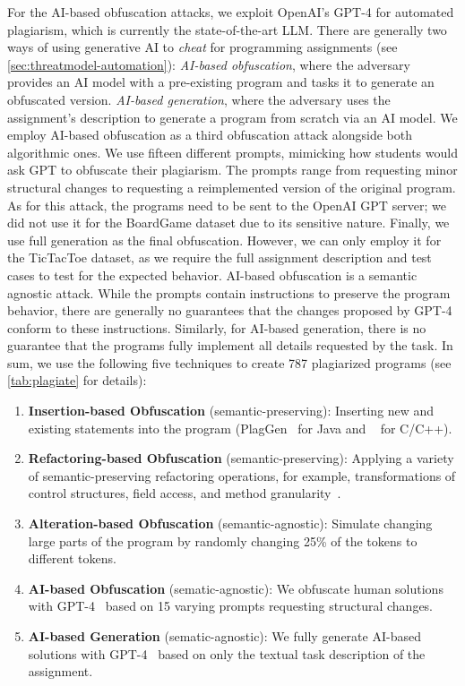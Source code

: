For the AI-based obfuscation attacks, we exploit OpenAI's GPT-4 for automated plagiarism, which is currently the state-of-the-art LLM.
There are generally two ways of using generative AI to \textit{cheat} for programming assignments (see \autoref{sec:threatmodel-automation}):
\textit{AI-based obfuscation}, where the adversary provides an AI model with a pre-existing program and tasks it to generate an obfuscated version.
\textit{AI-based generation}, where the adversary uses the assignment's description to generate a program from scratch via an AI model.
%
We employ AI-based obfuscation as a third obfuscation attack alongside both algorithmic ones. We use fifteen different prompts, mimicking how students would ask GPT to obfuscate their plagiarism.
The prompts range from requesting minor structural changes to requesting a reimplemented version of the original program. As for this attack, the programs need to be sent to the OpenAI GPT server; we did not use it for the BoardGame dataset due to its sensitive nature.
Finally, we use full generation as the final obfuscation. However, we can only employ it for the TicTacToe dataset, as we require the full assignment description and test cases to test for the expected behavior.
AI-based obfuscation is a semantic agnostic attack. While the prompts contain instructions to preserve the program behavior, there are generally no guarantees that the changes proposed by GPT-4 conform to these instructions. 
Similarly, for AI-based generation, there is no guarantee that the programs fully implement all details requested by the task.
In sum, we use the following five techniques to create 787 plagiarized programs (see \autoref{tab:plagiate} for details):
\begin{enumerate}[noitemsep]
 \item \textbf{Insertion-based Obfuscation} (semantic-preserving): Inserting new and existing statements into the program (PlagGen~\cite{Broedel2023} for Java and \mossad~\cite{DevoreMcDonald2020} for C/C++).
 \item \textbf{Refactoring-based Obfuscation} (semantic-preserving): Applying a variety of semantic-preserving refactoring operations, for example, transformations of control structures, field access, and method granularity~\cite{Maisch2024}.
 \item \textbf{Alteration-based Obfuscation} (semantic-agnostic): Simulate changing large parts of the program by randomly changing 25\% of the tokens to different tokens.
 \item \textbf{AI-based Obfuscation} (sematic-agnostic): We obfuscate human solutions with GPT-4~\cite{gpt4} based on 15 varying prompts requesting structural changes.
 \item \textbf{AI-based Generation} (sematic-agnostic): We fully generate AI-based solutions with GPT-4~\cite{gpt4} based on only the textual task description of the assignment.
\end{enumerate}
